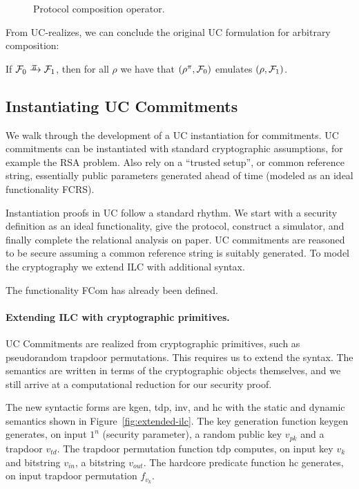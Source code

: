 \begin{figure}

\caption{Protocol composition operator.}
\label{fig:composition-operator}
\end{figure}

From UC-realizes, we can conclude the original UC formulation for arbitrary
composition:
\begin{theorem}
  If $\mc{F}_0 \yrightarrow{$\pi$} \mc{F}_1$, then for all $\rho$ we
  have that $(\rho^{\pi}, \mathcal{{F}}_0)$ emulates $(\rho, \mathcal{{F}}_1)$.
\end{theorem}

\subsection{Instantiating UC Commitments}
\label{subsec:example}
We walk through the development of a UC instantiation for commitments.  UC
commitments can be instantiated with standard cryptographic assumptions, for
example the RSA problem.  Also rely on a ``trusted setup'', or common reference
string, essentially public parameters generated ahead of time (modeled as an
ideal functionality FCRS).

Instantiation proofs in UC follow a standard rhythm. We start with a security
definition as an ideal functionality, give the protocol, construct a simulator,
and finally complete the relational analysis on paper.  UC commitments are
reasoned to be secure assuming a common reference string is suitably generated.
To model the cryptography we extend ILC with additional syntax.

The functionality FCom has already been defined.

\paragraph{Extending ILC with cryptographic primitives.}
UC Commitments are realized from cryptographic primitives, such as pseudorandom
trapdoor permutations. This requires us to extend the syntax. The semantics are
written in terms of the cryptographic objects themselves, and we still arrive at
a computational reduction for our security proof.

The new syntactic forms are \textsf{kgen}, \textsf{tdp}, \textsf{inv}, and
\textsf{hc} with the static and dynamic semantics shown in
Figure~\ref{fig:extended-ilc}. The key generation function \textsf{keygen}
generates, on input $1^n$ (security parameter), a random public key $v_{pk}$ and
a trapdoor $v_{td}$. The trapdoor permutation function \textsf{tdp} computes, on
input key $v_k$ and bitstring $v_{in}$, a bitstring $v_{out}$. The hardcore
predicate function \textsf{hc} generates, on input trapdoor permutation
$f_{v_k}$.

